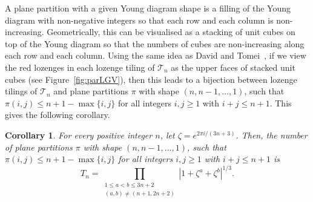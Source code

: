 \documentclass{article}
\newtheorem{corollary}[theorem]{Corollary}
\begin{document}
A plane partition with a given Young diagram shape is a filling of the Young diagram with non-negative integers so that each row and each column is non-increasing. Geometrically, this can be visualised as a stacking of unit cubes on top of the Young diagram so that the numbers of cubes are non-increasing along each row and each column. Using the same idea as David and Tomei~\cite{DT}, if we view the red lozenges in each lozenge tiling of $\mathcal{T}_n$ as the upper faces of stacked unit cubes (see Figure~\ref{fig:parLGV}), then this leads to a bijection between lozenge tilings of $\mathcal{T}_n$ and plane partitions $\pi$ with shape $(n,n-1,\ldots,1)$, such that $\pi(i,j)\leq n+1-\max\{i,j\}$ for all integers $i,j\geq1$ with $i+j\leq n+1$. This gives the following corollary. 
\begin{corollary}\label{cor:PP}
For every positive integer $n$, let $\zeta=e^{2\pi i/(3n+3)}$. Then, the number of plane partitions $\pi$ with shape $(n,n-1,\ldots,1)$, such that $\pi(i,j)\leq n+1-\max\{i,j\}$ for all integers $i,j\geq1$ with $i+j\leq n+1$ is 
\[T_n=\prod_{\substack{1\leq a<b\leq 3n+2\\(a,b)\not=(n+1,2n+2)}}\left|1+\zeta^a+\zeta^b\right|^{1/3}.\]
\end{corollary}
\end{document}
